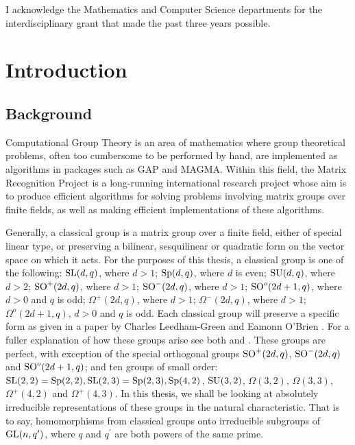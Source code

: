 \documentclass[12pt]{report}
\def\SL{{\rm SL}}
\def\GL{{\rm GL}}
\def\Sp{{\rm Sp}}
\def\SU{{\rm SU}}
\def\SO{{\rm SO}}
\begin{document}
I acknowledge the Mathematics and Computer Science departments for the interdisciplinary grant that made the past three years possible.

\newpage

\chapter{Introduction}

\section{Background}

Computational Group Theory is an area of mathematics where group theoretical problems, often too cumbersome to be performed by hand, are implemented as algorithms in packages such as {\sc GAP} and {\sc MAGMA}. Within this field, the Matrix Recognition Project is a long-running international research project whose aim is to produce efficient algorithms for solving problems involving matrix groups over finite fields, as well as making efficient implementations of these algorithms.

Generally, a classical group is a matrix group over a finite field, either of special linear type, or preserving a bilinear, sesquilinear or quadratic form on the vector space on which it acts. For the purposes of this thesis, a classical group is one of the following: $\SL(d, q)$, where $d > 1$; $\Sp(d, q)$, where $d$ is even; $\SU(d, q)$, where $d > 2$; $\SO^+(2d, q)$, where $d > 1$; $\SO^-(2d, q)$, where $d > 1$; $\SO^o(2d+1, q)$, where $d > 0$ and $q$ is odd; $\Omega^+(2d, q)$, where $d > 1$; $\Omega^-(2d, q)$, where $d >1$; $\Omega^o(2d+1, q)$, $d > 0$ and $q$ is odd. Each classical group will preserve a specific form as given in a paper by Charles Leedham-Green and Eamonn O'Brien \cite{Charles}. For a fuller explanation of how these groups arise see both \cite{Grove} and \cite{Don}. These groups are perfect, with exception of the special orthogonal groups $\SO^+(2d, q)$, $\SO^-(2d, q)$ and $\SO^o(2d+1, q)$; and ten groups of small order: $\SL(2, 2) = \Sp(2, 2), \SL(2, 3) = \Sp(2, 3), \Sp(4, 2)$, $\SU(3, 2)$, $\Omega(3, 2)$, $\Omega(3, 3)$, $\Omega^+(4, 2)$ and $\Omega^+(4, 3)$. In this thesis, we shall be looking at absolutely irreducible representations of these groups in the natural characteristic. That is to say, homomorphisms from classical groups onto irreducible subgroups of $\GL(n, q^\prime)$, where $q$ and $q^\prime$ are both powers of the same prime.
\end{document}
